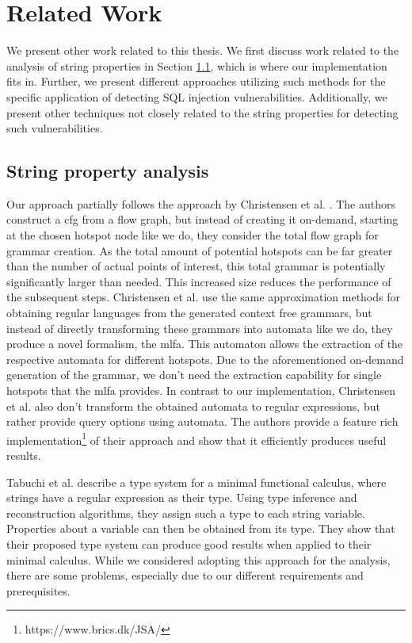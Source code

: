 \chapter{Related Work}
\label{chapter:RelatedWork}

We present other work related to this thesis. We first discuss work related to the analysis of string properties in Section \ref{sec:related:stringproperty}, which is where our implementation fits in. Further, we present different approaches utilizing such methods for the specific application of detecting SQL injection vulnerabilities. Additionally, we present other techniques not closely related to the string properties for detecting such vulnerabilities.


\section{String property analysis}\label{sec:related:stringproperty}

Our approach partially follows the approach by Christensen et al. \cite{brics}. The authors construct a \acl{cfg} from a flow graph, but instead of creating it on-demand, starting at the chosen hotspot node like we do, they consider the total flow graph for grammar creation.
As the total amount of potential hotspots can be far greater than the number of actual points of interest, this total grammar is potentially significantly larger than needed. This increased size reduces the performance of the subsequent steps.
Christensen et al. use the same approximation methods for obtaining regular languages from the generated context free grammars, but instead of directly transforming these grammars into automata like we do, they produce a novel formalism, the \ac{mlfa}.
This automaton allows the extraction of the respective automata for different hotspots. Due to the aforementioned on-demand generation of the grammar, we don't need the extraction capability for single hotspots that the \ac{mlfa} provides. In contrast to our implementation, Christensen et al. also don't transform the obtained automata to regular expressions, but rather provide query options using automata.
The authors provide a feature rich implementation\footnote{https://www.brics.dk/JSA/} of their approach and show that it efficiently produces useful results.

Tabuchi et al. \cite{regex_types} describe a type system for a minimal functional calculus, where strings have a regular expression as their type. Using type inference and reconstruction algorithms, they assign such a type to each string variable. Properties about a variable can then be obtained from its type.
They show that their proposed type system can produce good results when applied to their minimal calculus. While we considered adopting this approach for the analysis, there are some problems, especially due to our different requirements and prerequisites. 

